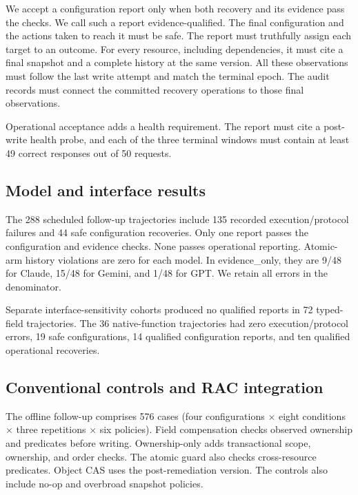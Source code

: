\documentclass[conference,10pt]{IEEEtran}
\begin{document}
We accept a configuration report only when both recovery and its evidence pass the checks. We call such a report evidence-qualified. The final configuration and the actions taken to reach it must be safe. The report must truthfully assign each target to an outcome. For every resource, including dependencies, it must cite a final snapshot and a complete history at the same version. All these observations must follow the last write attempt and match the terminal epoch. The audit records must connect the committed recovery operations to those final observations.

Operational acceptance adds a health requirement. The report must cite a post-write health probe, and each of the three terminal windows must contain at least 49 correct responses out of 50 requests.

\subsection{Model and interface results}

The 288 scheduled follow-up trajectories include 135 recorded execution/protocol failures and 44 safe configuration recoveries. Only one report passes the configuration and evidence checks. None passes operational reporting. Atomic-arm history violations are zero for each model. In evidence\_\allowbreak{}only, they are 9/48 for Claude, 15/48 for Gemini, and 1/48 for GPT. We retain all errors in the denominator.

Separate interface-sensitivity cohorts produced no qualified reports in 72 typed-field trajectories. The 36 native-function trajectories had zero execution/protocol errors, 19 safe configurations, 14 qualified configuration reports, and ten qualified operational recoveries.

\subsection{Conventional controls and RAC integration}

The offline follow-up comprises 576 cases (four configurations $\times$ eight conditions $\times$ three repetitions $\times$ six policies). Field compensation checks observed ownership and predicates before writing. Ownership-only adds transactional scope, ownership, and order checks. The atomic guard also checks cross-resource predicates. Object CAS uses the post-remediation version. The controls also include no-op and overbroad snapshot policies.
\end{document}
